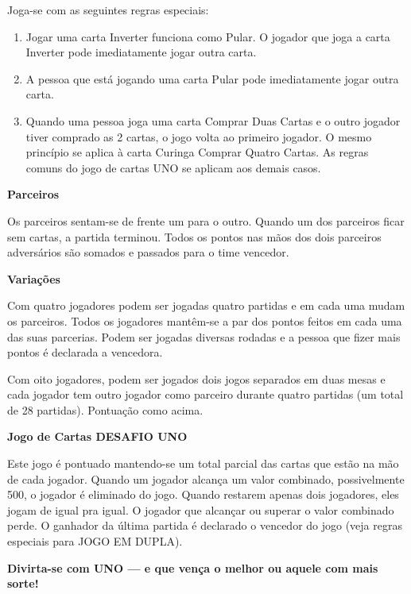 Joga-se com as seguintes regras especiais:

\begin{enumerate}
\item{Jogar uma carta Inverter funciona como Pular. O jogador que joga a carta Inverter pode imediatamente jogar outra carta.}
\item{A pessoa que está jogando uma carta Pular pode imediatamente jogar outra carta.}
\item{Quando uma pessoa joga uma carta Comprar Duas Cartas e o outro jogador tiver comprado as 2 cartas, o jogo volta ao primeiro jogador. O mesmo princípio se aplica à carta Curinga Comprar Quatro Cartas. As regras comuns do jogo de cartas UNO se aplicam aos demais casos.}
\end{enumerate}

\textbf{Parceiros}

Os parceiros sentam-se de frente um para o outro. Quando um dos parceiros ficar sem cartas, a partida terminou. Todos os pontos nas mãos dos dois parceiros adversários são somados e passados para o time vencedor.

\textbf{Variações}

Com quatro jogadores podem ser jogadas quatro partidas e em cada uma mudam os parceiros. Todos os jogadores mantêm-se a par dos pontos feitos em cada uma das suas parcerias. Podem ser jogadas diversas rodadas e a pessoa que fizer mais pontos é declarada a vencedora.

Com oito jogadores, podem ser jogados dois jogos separados em duas mesas e cada jogador tem outro jogador como parceiro durante quatro partidas (um total de 28 partidas). Pontuação como acima.

\textbf{Jogo de Cartas DESAFIO UNO}

Este jogo é pontuado mantendo-se um total parcial das cartas que estão na mão de cada jogador. Quando um jogador alcança um valor combinado, possivelmente 500, o jogador é eliminado do jogo. Quando restarem apenas dois jogadores, eles jogam de igual pra igual. O jogador que alcançar ou superar o valor combinado perde. O ganhador da última partida é declarado o vencedor do jogo (veja regras especiais para JOGO EM DUPLA).

\textbf{Divirta-se com UNO --- e que vença o melhor ou aquele com mais sorte!}